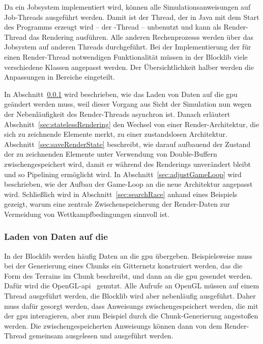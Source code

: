 Da ein Jobsystem implementiert wird, können alle Simulationsanweisungen auf Job-Threads ausgeführt werden. Damit ist der Thread, der in Java mit dem Start des Programms erzeugt wird -- der -Thread -- unbenutzt und kann als Render-Thread das Rendering ausführen. Alle anderen \glspl{Rechenprozess} werden über das Jobsystem auf anderen Threads durchgeführt. Bei der Implementierung der für einen Render-Thread notwendigen Funktionalität müssen in der Blocklib viele verschiedene Klassen angepasst werden. Der Übersichtlichkeit halber werden die Anpassungen in Bereiche eingeteilt. 

In Abschnitt~\ref{sec:loader} wird beschrieben, wie das Laden von Daten auf die \ac{gpu} geändert werden muss, weil dieser Vorgang aus Sicht der Simulation nun wegen der Nebenläufigkeit des Render-Threads asynchron ist. Danach erläutert Abschnitt~\ref{sec:statelessRendering} den Wechsel von einer Render-Architektur, die sich zu zeichnende Elemente merkt, zu einer zustandslosen Architektur. Abschnitt~\ref{sec:saveRenderState} beschreibt, wie darauf aufbauend der Zustand der zu zeichnenden Elemente unter Verwendung von Double-Buffern zwischengespeichert wird, damit er während des Renderings unverändert bleibt und so Pipelining ermöglicht wird. In Abschnitt~\ref{sec:adjustGameLoop} wird beschrieben, wie der Aufbau der Game-Loop an die neue Architektur angepasst wird. Schließlich wird in Abschnitt~\ref{sec:searchRace} anhand eines Beispiels gezeigt, warum eine zentrale Zwischenspeicherung der Render-Daten zur Vermeidung von Wettkampfbedingungen sinnvoll ist.

\subsubsection{Laden von Daten auf die }\label{sec:loader}
In der Blocklib werden häufig Daten an die \ac{gpu} übergeben. Beispielsweise muss bei der Generierung eines Chunks ein Gitternetz konstruiert werden, das die Form des Terrains im Chunk beschreibt, und dann an die \ac{gpu} gesendet werden. Dafür wird die OpenGL-\acs{api}~\cite{TheKhronosGroup} genutzt. Alle Aufrufe an OpenGL müssen auf einem Thread ausgeführt werden, die Blocklib wird aber nebenläufig ausgeführt. Daher muss dafür gesorgt werden, dass \glspl{Anweisung} zwischengespeichert werden, die mit der \ac{gpu} interagieren, aber zum Beispiel durch die Chunk-Generierung angestoßen werden. Die zwischengespeicherten \glspl{Anweisung} können dann von dem Render-Thread gemeinsam ausgelesen und ausgeführt werden. 

